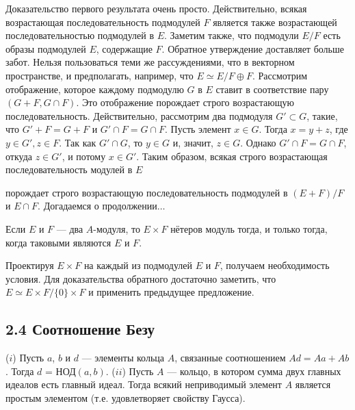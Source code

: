 \begin{myproof}
Доказательство первого результата очень просто. Действительно, всякая возрастающая последовательность подмодулей $F$ является также возрастающей последовательностью подмодулей в $E$. Заметим также, что подмодули $E/F$ есть образы подмодулей $E$, содержащие $F$. \newline Обратное утверждение доставляет больше забот. Нельзя пользоваться теми же рассуждениями, что в векторном пространстве, и предполагать, например, что $E \simeq E/F \oplus F$. \newline Рассмотрим отображение, которое каждому подмодулю $G$ в $E$ ставит в соответствие пару $(G + F, G \cap F)$. Это отображение порождает строго возрастающую последовательность. Действительно, рассмотрим два подмодуля $G' \subset G$, такие, что $G' + F = G + F$ и $G' \cap F = G \cap F$. Пусть элемент $x \in G$. Тогда $x = y + z$, где $y \in G', z \in F$. Так как $G' \cap G$, то $y \in G$ и, значит, $z \in G$. Однако $G' \cap F = G \cap F$, откуда $z \in G'$, и потому $x \in G'$. Таким образом, всякая строго возрастающая последовательность модулей в $E$

\newpage
\noindent порождает строго возрастающую последовательность подмодулей в $(E + F)/F$ и $E \cap F$. Догадаемся о продолжении$\dots$
\end{myproof}

\begin{predl}
\textit{\indent} Если $E$ и $F$ — два $A$-модуля, то $E \times F$ нётеров модуль тогда, и только тогда, когда таковыми являются $E$ и $F$.
\end{predl}

\begin{myproof}
Проектируя $E \times F$ на каждый из подмодулей $E$ и $F$, получаем необходимость условия. Для доказательства обратного достаточно заметить, что $E \simeq E \times F / \{0\} \times F$ и применить предыдущее предложение.
\end{myproof}

\subsection{\large 2.4 Соотношение Безу}

\begin{predl}
\textit{\indent} ($i$) Пусть $a$, $b$ и $d$ — элементы кольца $A$, связанные соотношением \newline $Ad = Aa + Ab$. Тогда $d$ = НОД$(a, b)$. \newline \indent($ii$) Пусть $A$ — кольцо, в котором сумма двух главных идеалов есть главный идеал. Тогда всякий неприводимый элемент $A$ является простым элементом (т.е. удовлетворяет свойству Гаусса).
\end{predl}

